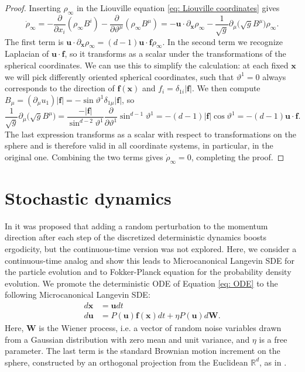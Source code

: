 \documentclass[tablecaption=bottom,wcp]{jmlr} %
\newcommand{\x}{\boldsymbol{x}}
\newcommand{\U}{\boldsymbol{u}}
\begin{document}
\begin{proof}
Inserting $\rho_{\infty}$ in the Liouville equation \eqref{eq: Liouville coordinates} gives
\begin{equation*}
    \dot{\rho}_{\infty} = - \frac{\partial}{\partial x_i} (\rho_{\infty} B^i) - \frac{\partial}{\partial \vartheta^{\mu}} ( \rho_{\infty} B^{\mu}) = - \U \cdot \partial_{\x} \rho_{\infty} - \frac{1}{\sqrt{g}} \partial_{\mu} \big( \sqrt{g} B^{\mu} \big) \rho_{\infty} .
\end{equation*}
The first term is $\U \cdot \partial_{\x} \rho_{\infty} = (d -1) \U \cdot \boldsymbol{f} \rho_{\infty}$. 
In the second term we recognize Laplacian of $\U \cdot \boldsymbol{f}$, so it transforms as a scalar under the transformations of the spherical coordinates. We can use this to simplify the calculation: at each fixed $\x$ we will pick differently oriented spherical coordinates, such that $\vartheta^1 = 0$ always corresponds to the direction of $\boldsymbol{f}(\x)$ and $f_i = \delta_{1 i} \vert \boldsymbol{f} \vert$. We then compute
$B_{\mu} = (\partial_{\mu} u_1) \vert \boldsymbol{f} \vert = - \sin \vartheta^1 \delta_{1 \mu} \vert \boldsymbol{f} \vert$,
so
\begin{equation*}
    \frac{1}{\sqrt{g}} \partial_{\mu} \big( \sqrt{g} B^{\mu} \big) = \frac{- \vert \boldsymbol{f} \vert}{\sin^{d-2} \vartheta^1} \frac{\partial}{\partial \vartheta^1 }\sin^{d-1} \vartheta^1
    = - (d - 1) \vert \boldsymbol{f} \vert \cos \vartheta^1 = - (d-1) \U \cdot \boldsymbol{f}.
\end{equation*}
The last expression transforms as a scalar with respect to transformations on the sphere and is therefore valid in all coordinate systems, in particular, in the original one. 
Combining the two terms gives $\dot{\rho}_{\infty} = 0$, completing the proof.
\end{proof}



\section{Stochastic dynamics} \label{sec: stochastic}
In \cite{MCHMC} it was proposed that adding a random perturbation to the momentum direction after each step of the discretized deterministic dynamics boosts ergodicity, but the continuous-time version was not explored. Here, we consider a continuous-time analog and show this leads 
to Microcanonical Langevin SDE for 
the particle evolution and to Fokker-Planck equation for the probability density evolution. We promote the deterministic ODE of Equation \eqref{eq: ODE} to the following Microcanonical 
Langevin SDE:
\begin{align} \label{eq:SDE}
    d \x &= \U dt \\ \nonumber
    d \U &= P(\U) \boldsymbol{f}(\x) dt + \eta P(\U) d \boldsymbol{W}. 
\end{align}
Here, $\boldsymbol{W}$ is the Wiener process, i.e. a vector of random noise variables drawn from a Gaussian distribution with 
zero mean and unit variance, and $\eta$ is a free parameter. The last term is the standard Brownian motion increment on the sphere, constructed by an orthogonal projection from the Euclidean $\mathbb{R}^d$, as in \cite{elworthyShort}.
\end{document}
